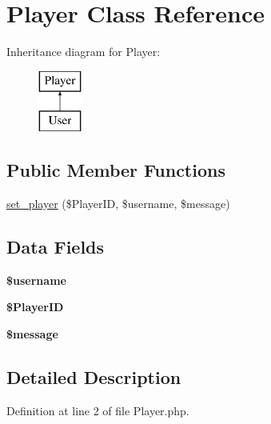 \hypertarget{class_player}{}\section{Player Class Reference}
\label{class_player}
Inheritance diagram for Player\+:\begin{figure}[H]
\begin{center}
\leavevmode
\includegraphics[height=2.000000cm]{class_player}
\end{center}
\end{figure}
\subsection*{Public Member Functions}
\begin{DoxyCompactItemize}
\item 
\hyperlink{class_player_a29bdabbd71ff2caf58838b676e8734b2}{set\+\_\+player} (\$Player\+ID, \$username, \$message)
\end{DoxyCompactItemize}
\subsection*{Data Fields}
\begin{DoxyCompactItemize}
\item 
\mbox{\label{class_player_a0eb82aa5f81cf845de4b36cd653c42cf}} 
{\bfseries \$username}
\item 
\mbox{\label{class_player_a9a4de079dad1eca41a99f7c18ab49485}} 
{\bfseries \$\+Player\+ID}
\item 
\mbox{\label{class_player_abf17cb2dba2ed17cb28aa5f37deb5293}} 
{\bfseries \$message}
\end{DoxyCompactItemize}


\subsection{Detailed Description}


Definition at line 2 of file Player.\+php.



